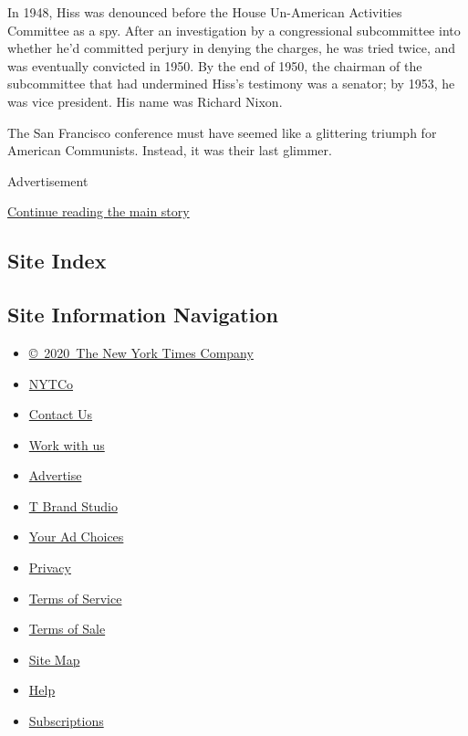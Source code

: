 In 1948, Hiss was denounced before the House Un-American Activities
Committee as a spy. After an investigation by a congressional
subcommittee into whether he'd committed perjury in denying the charges,
he was tried twice, and was eventually convicted in 1950. By the end of
1950, the chairman of the subcommittee that had undermined Hiss's
testimony was a senator; by 1953, he was vice president. His name was
Richard Nixon.

The San Francisco conference must have seemed like a glittering triumph
for American Communists. Instead, it was their last glimmer.

Advertisement

\protect\hyperlink{after-bottom}{Continue reading the main story}

\hypertarget{site-index}{%
\subsection{Site Index}\label{site-index}}

\hypertarget{site-information-navigation}{%
\subsection{Site Information
Navigation}\label{site-information-navigation}}

\begin{itemize}
\tightlist
\item
  \href{https://help.nytimes.com/hc/en-us/articles/115014792127-Copyright-notice}{©~2020~The
  New York Times Company}
\end{itemize}

\begin{itemize}
\tightlist
\item
  \href{https://www.nytco.com/}{NYTCo}
\item
  \href{https://help.nytimes.com/hc/en-us/articles/115015385887-Contact-Us}{Contact
  Us}
\item
  \href{https://www.nytco.com/careers/}{Work with us}
\item
  \href{https://nytmediakit.com/}{Advertise}
\item
  \href{http://www.tbrandstudio.com/}{T Brand Studio}
\item
  \href{https://www.nytimes.com/privacy/cookie-policy\#how-do-i-manage-trackers}{Your
  Ad Choices}
\item
  \href{https://www.nytimes.com/privacy}{Privacy}
\item
  \href{https://help.nytimes.com/hc/en-us/articles/115014893428-Terms-of-service}{Terms
  of Service}
\item
  \href{https://help.nytimes.com/hc/en-us/articles/115014893968-Terms-of-sale}{Terms
  of Sale}
\item
  \href{https://spiderbites.nytimes.com}{Site Map}
\item
  \href{https://help.nytimes.com/hc/en-us}{Help}
\item
  \href{https://www.nytimes.com/subscription?campaignId=37WXW}{Subscriptions}
\end{itemize}

